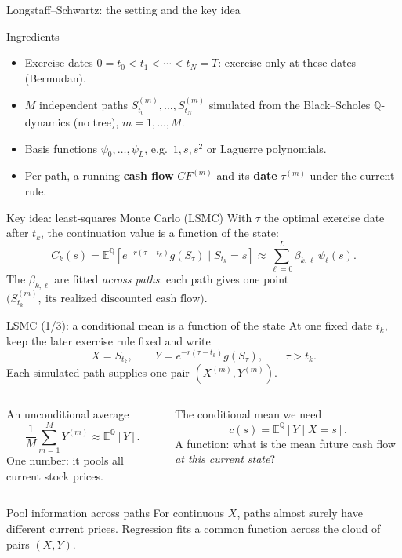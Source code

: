 \documentclass[handout,10pt,aspectratio=169]{beamer}
\newcommand{\E}{\mathbb E}
\newcommand{\Q}{\mathbb Q}
\begin{document}
\begin{frame}{Longstaff--Schwartz: the setting and the key idea}
\small
\begin{block}{Ingredients}
\begin{itemize}
\item Exercise dates \(0=t_0<t_1<\cdots<t_N=T\): exercise only at these dates (Bermudan).
\item \(M\) independent paths \(S^{(m)}_{t_0},\ldots,S^{(m)}_{t_N}\) simulated
      from the Black--Scholes \(\Q\)-dynamics (no tree), \(m=1,\ldots,M\).
\item Basis functions \(\psi_0,\ldots,\psi_L\), e.g.\ \(1,s,s^2\) or Laguerre polynomials.
\item Per path, a running \textbf{cash flow} \(CF^{(m)}\) and its
      \textbf{date} \(\tau^{(m)}\) under the current rule.
\end{itemize}
\end{block}
\begin{exampleblock}{Key idea: least-squares Monte Carlo (LSMC)}
With \(\tau\) the optimal exercise date after \(t_k\), the continuation value
is a function of the state:
\[
C_k(s)=\E^\Q\!\left[e^{-r(\tau-t_k)}g(S_\tau)\mid S_{t_k}=s\right]
\approx\sum_{\ell=0}^L\beta_{k,\ell}\,\psi_\ell(s).
\]
The \(\beta_{k,\ell}\) are fitted \emph{across paths}: each path gives one point
\(\bigl(S^{(m)}_{t_k},\ \text{its realized discounted cash flow}\bigr)\).
\end{exampleblock}
\end{frame}

\begin{frame}{LSMC (1/3): a conditional mean is a function of the state}
\small
At one fixed date \(t_k\), keep the later exercise rule fixed and write
\[
X=S_{t_k},\qquad Y=e^{-r(\tau-t_k)}g(S_\tau),\qquad \tau>t_k.
\]
Each simulated path supplies one pair \((X^{(m)},Y^{(m)})\).
\begin{columns}[T,onlytextwidth]
\begin{block}{An unconditional average}
\[
\frac1M\sum_{m=1}^M Y^{(m)}\approx\E^\Q[Y].
\]
One number: it pools all current stock prices.
\end{block}
\begin{exampleblock}{The conditional mean we need}
\[
c(s)=\E^\Q[Y\mid X=s].
\]
A function: what is the mean future cash flow \emph{at this current state}?
\end{exampleblock}
\end{columns}
\begin{exampleblock}{Pool information across paths}
For continuous \(X\), paths almost surely have different current prices.
Regression fits a common function across the cloud of pairs \((X,Y)\).
\end{exampleblock}
\end{frame}
\end{document}
